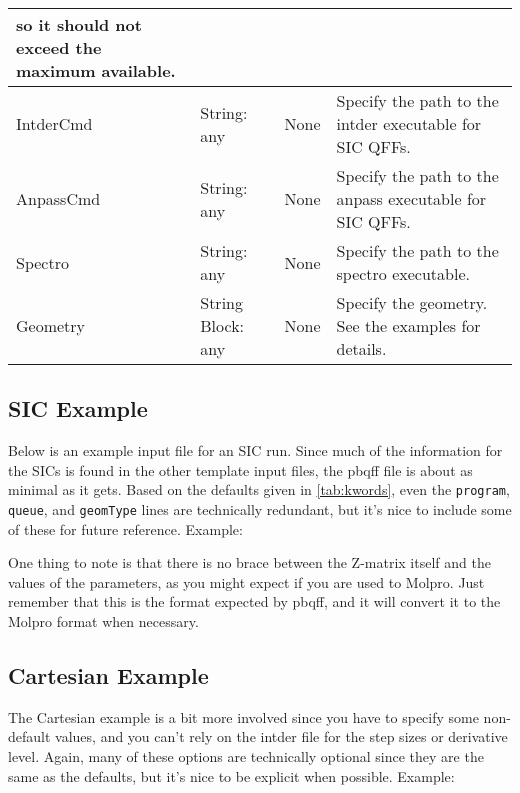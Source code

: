 \documentclass{article}
\begin{document}
\begin{table}[ht]
\begin{tabular}{|l|>{\raggedright}p{}|l|p{}|}
                                                   so it should not exceed the maximum available.\\
    \hline
    IntderCmd                     & String: any & None & Specify the path to the intder executable for SIC QFFs.\\
    \hline
    AnpassCmd                     & String: any & None & Specify the path to the anpass executable for SIC QFFs.\\
    \hline
    Spectro                    & String: any & None & Specify the path to the spectro executable.\\
    \hline
    Geometry                      & String Block: any & None & Specify the geometry. See the examples for details.\\
    \hline
  \end{tabular}
\end{table}

\subsection{SIC Example}

Below is an example input file for an SIC run. Since much of the
information for the SICs is found in the other template input files,
the pbqff file is about as minimal as it gets. Based on the defaults
given in \autoref{tab:kwords}, even the \verb|program|,
\verb|queue|, and \verb|geomType| lines are technically redundant, but
it's nice to include some of these for future reference. Example:



One thing to note is that there is no brace between the Z-matrix
itself and the values of the parameters, as you might expect if you
are used to Molpro. Just remember that this is the format expected by
pbqff, and it will convert it to the Molpro format when necessary.

\subsection{Cartesian Example}

The Cartesian example is a bit more involved since you have to specify
some non-default values, and you can't rely on the intder file for the
step sizes or derivative level. Again, many of these options are
technically optional since they are the same as the defaults, but it's
nice to be explicit when possible. Example:
\end{document}
